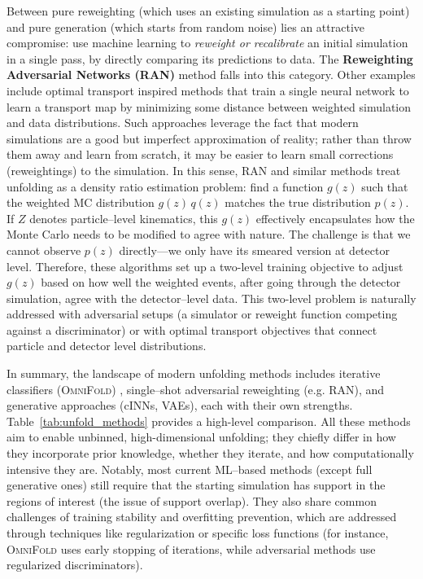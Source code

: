         Between pure reweighting (which uses an existing simulation as a starting point) and pure generation (which starts from random noise) lies an attractive compromise: use machine learning to \emph{reweight or recalibrate} an initial simulation in a single pass, by directly comparing its predictions to data.
        The \textbf{Reweighting Adversarial Networks (RAN)} method falls into this category.
        Other examples include optimal transport inspired methods that train a single neural network to learn a transport map by minimizing some distance between weighted simulation and data distributions.
        Such approaches leverage the fact that modern simulations are a good but imperfect approximation of reality; rather than throw them away and learn from scratch, it may be easier to learn small corrections (reweightings) to the simulation.
        In this sense, RAN and similar methods treat unfolding as a density ratio estimation problem: find a function $g(z)$ such that the weighted MC distribution $g(z)\,q(z)$ matches the true distribution $p(z)$.
        If $Z$ denotes particle--level kinematics, this $g(z)$ effectively encapsulates how the Monte Carlo needs to be modified to agree with nature.
        The challenge is that we cannot observe $p(z)$ directly---we only have its smeared version at detector level.
        Therefore, these algorithms set up a {two-level} training objective to adjust $g(z)$ based on how well the weighted events, after going through the detector simulation, agree with the detector--level data.
        This two-level problem is naturally addressed with adversarial setups (a simulator or reweight function competing against a discriminator) or with optimal transport objectives that connect particle and detector level distributions.

        In summary, the landscape of modern unfolding methods includes iterative classifiers (\textsc{\textsc{OmniFold}}) , single--shot adversarial reweighting (e.g. RAN), and generative approaches (cINNs, VAEs), each with their own strengths.
        Table~\ref{tab:unfold_methods} provides a high-level comparison.
        All these methods aim to enable unbinned, high-dimensional unfolding; they chiefly differ in how they incorporate prior knowledge, whether they iterate, and how computationally intensive they are.
        Notably, most current ML--based methods (except full generative ones) still require that the starting simulation has support in the regions of interest (the issue of support overlap).
        They also share common challenges of training stability and overfitting prevention, which are addressed through techniques like regularization or specific loss functions (for instance, \textsc{OmniFold} uses early stopping of iterations, while adversarial methods use regularized discriminators).

